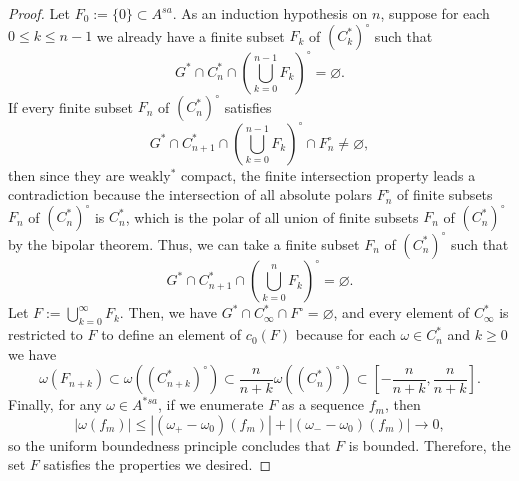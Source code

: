\documentclass[a4paper]{amsart}
\theoremstyle{plain}
\theoremstyle{definition}
\begin{document}
\begin{proof}
Let $F_0:=\{0\}\subset A^{sa}$.
As an induction hypothesis on $n$, suppose for each $0\le k\le n-1$ we already have a finite subset $F_k$ of $(C_k^*)^\circ$ such that
\[G^*\cap C^*_n\cap\left(\bigcup_{k=0}^{n-1}F_k\right)^\circ=\varnothing.\]
If every finite subset $F_n$ of $(C_n^*)^\circ$ satisfies
\[G^*\cap C_{n+1}^*\cap\left(\bigcup_{k=0}^{n-1}F_k\right)^\circ\cap F_n^\circ\ne\varnothing,\]
then since they are weakly$^*$ compact, the finite intersection property leads a contradiction because the intersection of all absolute polars $F_n^\circ$ of finite subsets $F_n$ of $(C_n^*)^\circ$ is $C_n^*$, which is the polar of all union of finite subsets $F_n$ of $(C_n^*)^\circ$ by the bipolar theorem.
Thus, we can take a finite subset $F_n$ of $(C_n^*)^\circ$ such that
\[G^*\cap C_{n+1}^*\cap\left(\bigcup_{k=0}^nF_k\right)^\circ=\varnothing.\]
Let $F:=\bigcup_{k=0}^\infty F_k$.
Then, we have $G^*\cap C_\infty^*\cap F^\circ=\varnothing$, and every element of $C_\infty^*$ is restricted to $F$ to define an element of $c_0(F)$ because for each $\omega\in C_n^*$ and $k\ge0$ we have 
\[\omega(F_{n+k})\subset\omega((C_{n+k}^*)^\circ)\subset\frac n{n+k}\omega((C_n^*)^\circ)\subset[-\frac n{n+k},\frac n{n+k}].\]
Finally, for any $\omega\in A^{*sa}$, if we enumerate $F$ as a sequence $f_m$, then
\[|\omega(f_m)|\le|(\omega_+-\omega_0)(f_m)|+|(\omega_--\omega_0)(f_m)|\to0,\]
so the uniform boundedness principle concludes that $F$ is bounded.
Therefore, the set $F$ satisfies the properties we desired.
\end{proof}
\end{document}
